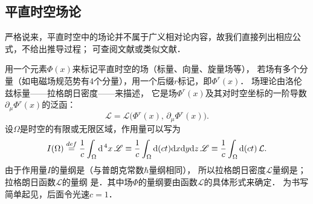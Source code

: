 %
%





\subsection{平直时空场论}\label{chlh:sec_lag-ham}

严格说来，平直时空中的场论并不属于广义相对论内容，故我们直接列出相应公式，不给出推导过程；
可查阅文献\parencite[\S 2.4]{Greiner-FQ-1996}或类似文献．


用一个元素$\Phi(x)$来标记平直时空的场（标量、向量、旋量场等），
若场有多个分量（如电磁场规范势有4个分量），用一个后缀$r$标记，即$\Phi^r(x)$．
场理论由洛伦兹标量——拉格朗日密度——来描述，
它是场$\Phi^r(x)$及其对时空坐标的一阶导数$\partial_{\mu}\Phi^r(x)$的泛函：
\begin{equation}\label{chlh:eqn_Lagrange_density-sr}
    \mathscr{L} = \mathscr{L}\bigl(\Phi^r(x),\, \partial_{\mu}\Phi^r(x) \bigr) .
\end{equation}
设$\Omega$是时空的有限或无限区域，作用量可以写为
\begin{equation}\label{chlh:eqn_action-sr}
    I(\Omega) \overset{def}{=} \frac{1}{c} \int_\Omega {\rm d}^{\,4}x \,{\mathscr{L}}
    \equiv  \frac{1}{c} \int_\Omega {{\rm d}(ct){\rm d}x {\rm d}y {\rm d}z} \,{\mathscr{L}} 
    \equiv  \frac{1}{c} \int_\Omega {\rm d}(ct)  \,\mathcal{L}.
\end{equation}
由于作用量$I$的量纲是{}（与普朗克常数$\hbar$量纲相同），
所以拉格朗日密度$\mathscr{L}$量纲是{}；
拉格朗日函数$\mathcal{L} $的量纲
是{}．其中场$\Phi$的量纲要由函数$\mathscr{L}$的具体形式来确定．
为书写简单起见，后面令光速$c=1$．

